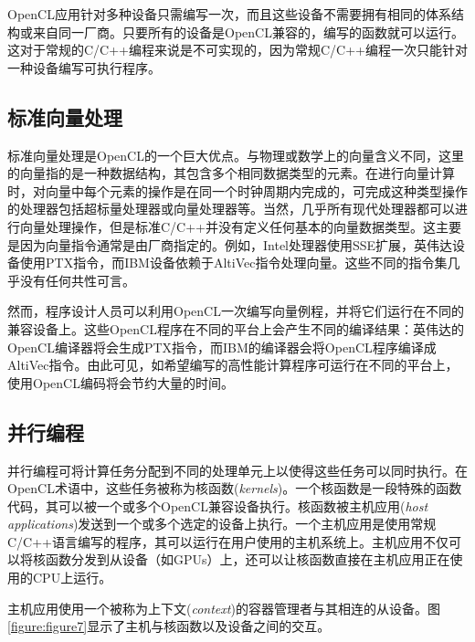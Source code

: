 OpenCL应用针对多种设备只需编写一次，而且这些设备不需要拥有相同的体系结构或来自同一厂商。只要所有的设备是OpenCL兼容的，编写的函数就可以运行。这对于常规的C/C++编程来说是不可实现的，因为常规C/C++编程一次只能针对一种设备编写可执行程序。

\subsection{标准向量处理}

标准向量处理是OpenCL的一个巨大优点。与物理或数学上的向量含义不同，这里的向量指的是一种数据结构，其包含多个相同数据类型的元素。在进行向量计算时，对向量中每个元素的操作是在同一个时钟周期内完成的，可完成这种类型操作的处理器包括超标量处理器或向量处理器等。当然，几乎所有现代处理器都可以进行向量处理操作，但是标准C/C++并没有定义任何基本的向量数据类型。这主要是因为向量指令通常是由厂商指定的。例如，Intel处理器使用SSE扩展，英伟达设备使用PTX指令，而IBM设备依赖于AltiVec指令处理向量。这些不同的指令集几乎没有任何共性可言。

然而，程序设计人员可以利用OpenCL一次编写向量例程，并将它们运行在不同的兼容设备上。这些OpenCL程序在不同的平台上会产生不同的编译结果：英伟达的OpenCL编译器将会生成PTX指令，而IBM的编译器会将OpenCL程序编译成AltiVec指令。由此可见，如希望编写的高性能计算程序可运行在不同的平台上，使用OpenCL编码将会节约大量的时间。

\subsection{并行编程}

并行编程可将计算任务分配到不同的处理单元上以使得这些任务可以同时执行。在OpenCL术语中，这些任务被称为核函数(\emph{kernels})。一个核函数是一段特殊的函数代码，其可以被一个或多个OpenCL兼容设备执行。核函数被主机应用(\emph{host applications})发送到一个或多个选定的设备上执行。一个主机应用是使用常规C/C++语言编写的程序，其可以运行在用户使用的主机系统上。主机应用不仅可以将核函数分发到从设备（如GPUs）上，还可以让核函数直接在主机应用正在使用的CPU上运行。

主机应用使用一个被称为上下文(\emph{context})的容器管理者与其相连的从设备。图\ref{figure:figure7}显示了主机与核函数以及设备之间的交互。

